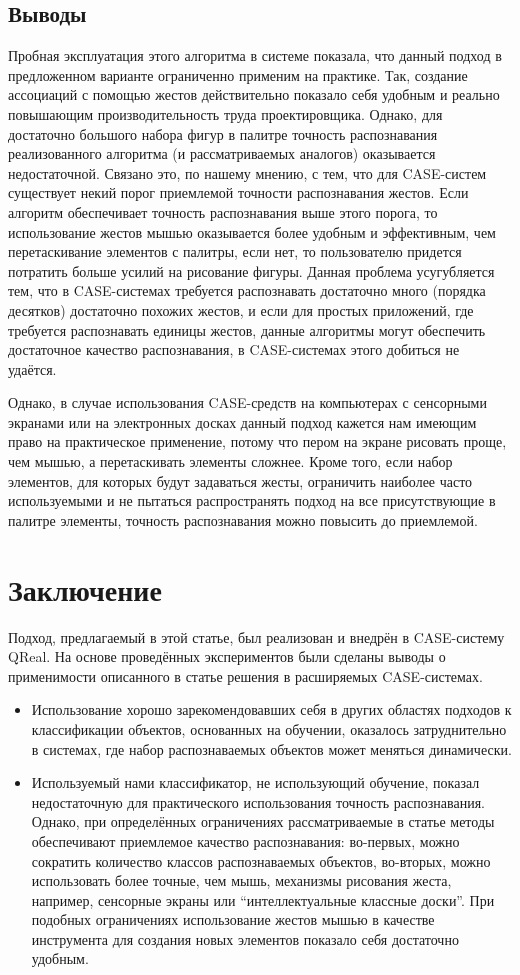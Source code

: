 \documentclass[a5paper]{article}
\begin{document}
\subsection{Выводы}
Пробная эксплуатация этого алгоритма в системе показала, что данный подход в предложенном варианте ограниченно применим на практике. Так, создание ассоциаций с помощью жестов действительно показало себя удобным и реально повышающим производительность труда проектировщика. Однако, для достаточно большого набора фигур в палитре точность распознавания реализованного алгоритма (и рассматриваемых аналогов) оказывается недостаточной. Связано это, по нашему мнению, с тем, что для CASE-систем существует некий порог приемлемой точности распознавания жестов. Если алгоритм обеспечивает точность распознавания выше этого порога, то использование жестов мышью оказывается более удобным и эффективным, чем перетаскивание элементов с палитры, если нет, то пользователю придется потратить больше усилий на рисование фигуры. Данная проблема усугубляется тем, что в CASE-системах требуется распознавать достаточно много (порядка десятков) достаточно похожих жестов, и если для простых приложений, где требуется распознавать единицы жестов, данные алгоритмы могут обеспечить достаточное качество распознавания, в CASE-системах этого добиться не удаётся.

Однако, в случае использования CASE-средств на компьютерах с сенсорными экранами или на электронных досках данный подход кажется нам имеющим право на практическое применение, потому что пером на экране рисовать проще, чем мышью, а перетаскивать элементы сложнее. Кроме того, если набор элементов, для которых будут задаваться жесты, ограничить наиболее часто используемыми и не пытаться распространять подход на все присутствующие в палитре элементы, точность распознавания можно повысить до приемлемой.

\section{Заключение}
Подход, предлагаемый в этой статье, был реализован и внедрён в CASE-систему QReal. На основе проведённых экспериментов были сделаны выводы о применимости описанного в статье решения в расширяемых CASE-системах.
\begin{itemize}
  \item Использование хорошо зарекомендовавших себя в других областях подходов к классификации объектов, основанных на обучении, оказалось затруднительно в системах, где набор распознаваемых объектов может меняться динамически.
  \item Используемый нами классификатор, не использующий обучение, показал недостаточную для практического использования точность распознавания. Однако, при определённых ограничениях рассматриваемые в статье методы обеспечивают приемлемое качество распознавания: во-первых, можно сократить количество классов  распознаваемых объектов, во-вторых, можно использовать более точные, чем мышь, механизмы рисования жеста, например, сенсорные экраны или ``интеллектуальные классные доски''. При подобных ограничениях использование жестов мышью в качестве инструмента для создания новых элементов показало себя достаточно удобным.
\end{itemize}
\end{document}
